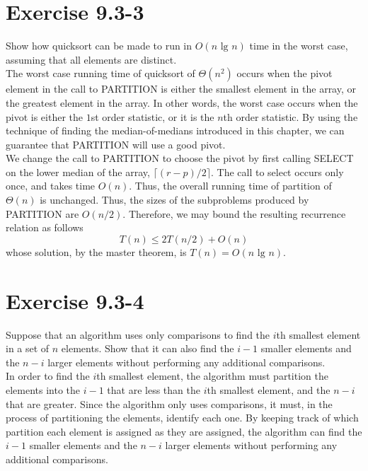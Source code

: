\documentclass[10pt,a4paper]{article}
\begin{document}
\section*{Exercise 9.3-3}
Show how quicksort can be made to run in $O(n\text{ lg }n)$ time in the worst case, assuming that all elements are distinct.
\vspace*{\baselineskip}
\\
The worst case running time of quicksort of $\Theta (n^2)$ occurs when the pivot element in the call to PARTITION is either the smallest element in the array, or the greatest element in the array. In other words, the worst case occurs when the pivot is either the $1$st order statistic, or it is the $n$th order statistic. By using the technique of finding the median-of-medians introduced in this chapter, we can guarantee that PARTITION will use a good pivot.
\vspace*{\baselineskip}
\\
We change the call to PARTITION to choose the pivot by first calling SELECT on the lower median of the array, $\lceil (r-p)/2\rceil$. The call to select occurs only once, and takes time $O(n)$. Thus, the overall running time of partition of $\Theta (n)$ is unchanged. Thus, the sizes of the subproblems produced by PARTITION are $O(n/2)$. Therefore, we may bound the resulting recurrence relation as follows
\begin{equation}
T(n) \leq 2T(n/2) + O(n)
\end{equation}
whose solution, by the master theorem, is $T(n)=O(n\text{ lg }n)$.

\section*{Exercise 9.3-4}
Suppose that an algorithm uses only comparisons to find the $i$th smallest element in a set of $n$ elements. Show that it can also find the $i-1$ smaller elements and the $n-i$ larger elements without performing any additional comparisons.
\vspace*{\baselineskip}
\\
In order to find the $i$th smallest element, the algorithm must partition the elements into the $i-1$ that are less than the $i$th smallest element, and the $n-i$ that are greater. Since the algorithm only uses comparisons, it must, in the process of partitioning the elements, identify each one. By keeping track of which partition each element is assigned as they are assigned, the algorithm can find the $i-1$ smaller elements and the $n-i$ larger elements without performing any additional comparisons.
\end{document}
